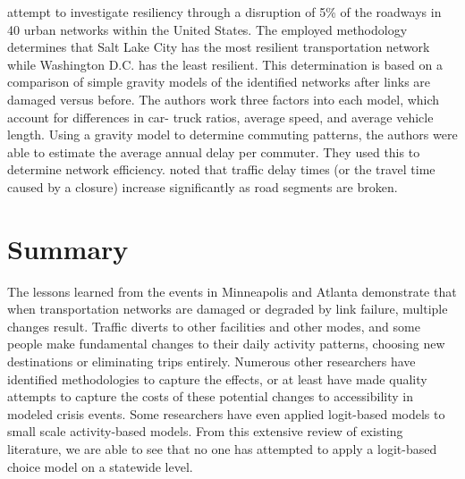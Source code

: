 \citet{ganin2017} attempt to investigate resiliency through a disruption
of 5\% of the roadways
in 40 urban networks within the United States. The employed methodology
determines that Salt Lake
City has the most resilient transportation network while Washington D.C.
has the least resilient.
This determination is based on a comparison of simple gravity models of the identified networks after links are
damaged versus before.
The authors work three factors into each model, which account for
differences in car-
truck ratios, average speed, and average vehicle length. Using a gravity
model to determine commuting patterns, the authors were
able to estimate the average
annual delay per commuter. They used this to determine network efficiency.
\citet{ganin2017} noted that
traffic delay times (or the travel time caused by a closure) increase
significantly as road segments are broken.

\section{Summary}

The lessons learned from the events in Minneapolis and Atlanta demonstrate
that when
transportation networks are damaged or degraded by link failure, multiple
changes result. Traffic
diverts to other facilities and other modes, and some people make
fundamental changes to their
daily activity patterns, choosing new destinations or eliminating trips
entirely. Numerous other
researchers have identified methodologies to capture the effects, or at
least have made quality attempts to capture the costs of these
potential changes to accessibility in modeled crisis events. Some researchers
have even applied logit-based models to small scale activity-based models.
From this extensive review of existing literature, we are able to see that no
one has attempted to apply a logit-based choice model on a statewide level.
